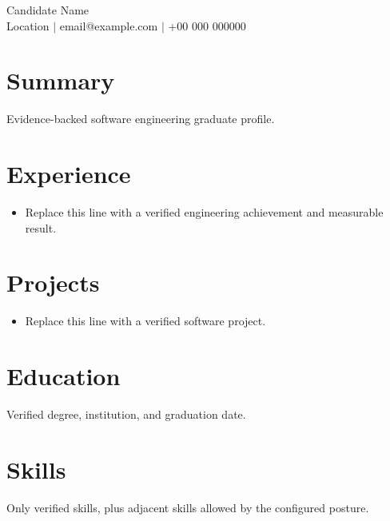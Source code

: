 \documentclass[10pt,a4paper]{article}
\begin{document}
\begin{center}
{\LARGE Candidate Name}\\
Location $\vert$ email@example.com $\vert$ +00 000 000000
\end{center}
\section{Summary}
Evidence-backed software engineering graduate profile.
\section{Experience}
\begin{itemize}
\item Replace this line with a verified engineering achievement and measurable result.
\end{itemize}
\section{Projects}
\begin{itemize}
\item Replace this line with a verified software project.
\end{itemize}
\section{Education}
Verified degree, institution, and graduation date.
\section{Skills}
Only verified skills, plus adjacent skills allowed by the configured posture.
\end{document}
